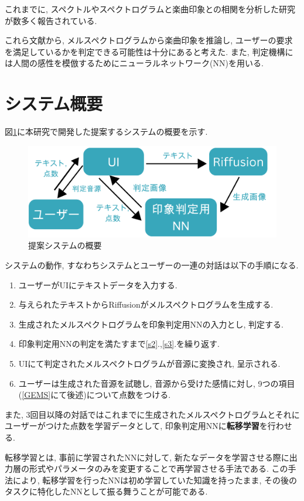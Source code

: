 \documentclass[a4paper,11pt,dvipdfmx]{jreport}
\begin{document}
これまでに, スペクトルやスペクトログラムと楽曲印象との相関を分析した研究が数多く報告されている\cite{Nagoya,Tokyo, Matsue}.

これら文献から, メルスペクトログラムから楽曲印象を推論し, 
ユーザーの要求を満足しているかを判定できる可能性は十分にあると考えた.
また, 判定機構には人間の感性を模倣するためにニューラルネットワーク(NN)を用いる.

\newpage
\section{システム概要}
図\ref{system}に本研究で開発した提案するシステムの概要を示す.

\begin{figure}[htbp]
  \centering
  \includegraphics[width=\linewidth]{sys.png}
  \caption{提案システムの概要}
  \label{system}
\end{figure}

システムの動作, すなわちシステムとユーザーの一連の対話は以下の手順になる.
\begin{enumerate}
  \item ユーザーがUIにテキストデータを入力する.\label{s1}
  \item 与えられたテキストからRiffusionがメルスペクトログラムを生成する.\label{s2}
  \item 生成されたメルスペクトログラムを印象判定用NNの入力とし, 判定する.\label{s3}
  \item 印象判定用NNの判定を満たすまで\ref{s2}.,\ref{s3}.を繰り返す.
  \item UIにて判定されたメルスペクトログラムが音源に変換され, 呈示される.
  \item ユーザーは生成された音源を試聴し, 音源から受けた感情に対し, 9つの項目(\ref{GEMS}にて後述)について点数をつける.
\end{enumerate}
また, 3回目以降の対話ではこれまでに生成されたメルスペクトログラムとそれにユーザーがつけた点数を学習データとして,
印象判定用NNに\textbf{転移学習}を行わせる.

転移学習とは, 事前に学習されたNNに対して, 
新たなデータを学習させる際に出力層の形式やパラメータのみを変更することで再学習させる手法である.
この手法により, 転移学習を行ったNNは初め学習していた知識を持ったまま, 
その後のタスクに特化したNNとして振る舞うことが可能である.
\end{document}
